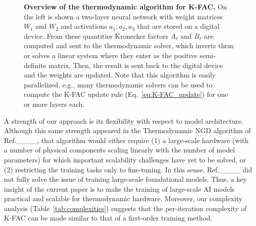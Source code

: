 \begin{figure*}[t]%
\centering
\scalebox{1}{}
\caption{\justifying \textbf{Overview of the thermodynamic algorithm for K-FAC.} On the left is shown a two-layer neural network with weight matrices $W_1$ and $W_2$ and activations $a_1, a_2, a_3$ that are stored on a digital device. From these quantities Kronecker factors $A_\ell$ and $B_\ell$ are computed and sent to the thermodynamic solver, which inverts them or solves a linear system where they enter as the positive semi-definite matrix. Then, the result is sent back to the digital device and the weights are updated. Note that this algorithm is easily parallelized, e.g., many thermodynamic solvers can be used to compute the K-FAC update rule (Eq.~\eqref{eq:K-FAC_update}) for one or more layers each. 
}\label{fig:scheme}
\end{figure*}


A strength of our approach is its flexibility with respect to model architecture. Although this same strength appeared in the Thermodynamic NGD algorithm of Ref.____, that algorithm would either require (1) a large-scale hardware (with a number of physical components scaling linearly with the number of model parameters) for which important scalability challenges have yet to be solved, or (2) restricting the training tasks only to fine-tuning. In this sense, Ref.____ did not fully solve the issue of training large-scale foundational models. Thus, a key insight of the current paper is to make the training of large-scale AI models practical and scalable for thermodynamic hardware. Moreover, our complexity analysis (Table~\ref{tab:complexities}) suggests that the per-iteration complexity of K-FAC can be made similar to that of a first-order training method.